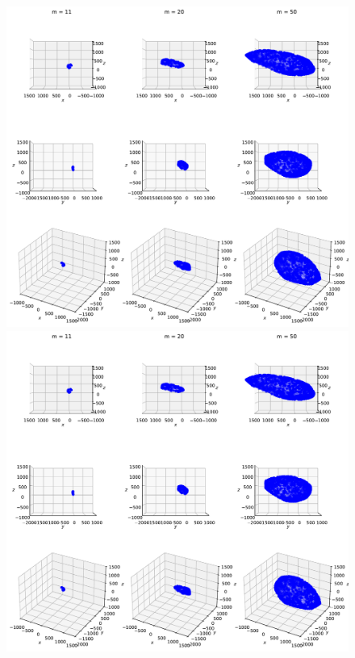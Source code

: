\begin{figure}[!htb]
    \captionsetup{justification=centering}
    \begin{minipage}{1\linewidth}
        \centering
        \includegraphics[trim={0 700 0 0},clip, width=0.9\linewidth]{img/chapter_3/zonotopes_looks_like_ellipsoids_2_same_scale.pdf}
    \end{minipage}
    \begin{minipage}{1\linewidth}
        \centering
        \includegraphics[trim={0 500 0 60},clip, width=0.9\linewidth]{img/chapter_3/zonotopes_looks_like_ellipsoids_2_same_scale.pdf}

\end{minipage}
\end{figure}
